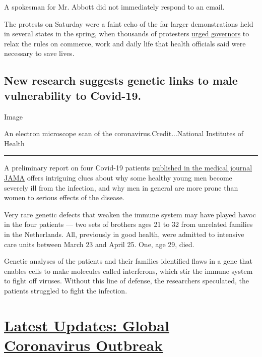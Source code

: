 A spokesman for Mr. Abbott did not immediately respond to an email.

The protests on Saturday were a faint echo of the far larger
demonstrations held in several states in the spring, when thousands of
protesters
\href{https://www.nytimes3xbfgragh.onion/2020/04/16/us/coronavirus-rules-protests.html}{urged
governors} to relax the rules on commerce, work and daily life that
health officials said were necessary to save lives.

\hypertarget{new-research-suggests-genetic-links-to-male-vulnerability-to-covid-19}{%
\subsection{New research suggests genetic links to male vulnerability to
Covid-19.}\label{new-research-suggests-genetic-links-to-male-vulnerability-to-covid-19}}

Image

An electron microscope scan of the coronavirus.Credit...National
Institutes of Health

\begin{center}\rule{0.5\linewidth}{\linethickness}\end{center}

A preliminary report on four Covid-19 patients
\href{https://jamanetwork.com/journals/jama/fullarticle/2768926}{published
in the medical journal JAMA} offers intriguing clues about why some
healthy young men become severely ill from the infection, and why men in
general are more prone than women to serious effects of the disease.

Very rare genetic defects that weaken the immune system may have played
havoc in the four patients --- two sets of brothers ages 21 to 32 from
unrelated families in the Netherlands. All, previously in good health,
were admitted to intensive care units between March 23 and April 25.
One, age 29, died.

Genetic analyses of the patients and their families identified flaws in
a gene that enables cells to make molecules called interferons, which
stir the immune system to fight off viruses. Without this line of
defense, the researchers speculated, the patients struggled to fight the
infection.

\hypertarget{latest-updates-global-coronavirus-outbreak}{%
\section{\texorpdfstring{\href{https://www.nytimes3xbfgragh.onion/2020/07/24/world/coronavirus-covid-19.html?action=click\&pgtype=Article\&state=default\&module=styln-coronavirus-national\&region=MAIN_CONTENT_1\&context=storylines_live_updates}{Latest
Updates: Global Coronavirus
Outbreak}}{Latest Updates: Global Coronavirus Outbreak}}\label{latest-updates-global-coronavirus-outbreak}}

